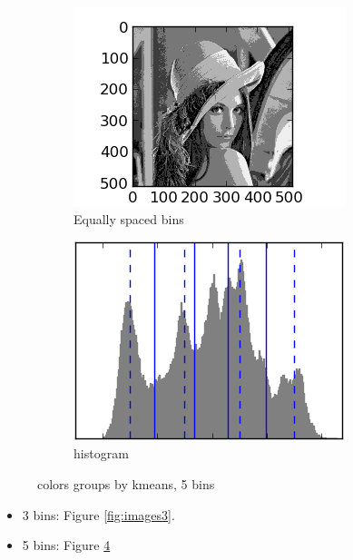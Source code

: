 \documentclass{article}
\begin{document}
\begin{figure}
\begin{subfigure}[b]{0.3\textwidth}
                    \label{fig:compressed5}
            \end{subfigure}
            ~ %
            \begin{subfigure}[b]{0.3\textwidth}
                    \centering
                    \includegraphics[width=\textwidth]{equal_bins_5.png}
                    \caption{Equally spaced bins}
                    \label{fig:equal_bins5}
            \end{subfigure}
            
            \begin{subfigure}[b]{0.3\textwidth}
                    \centering
                    \includegraphics[width=\textwidth]{histogram_5.png}
                    \caption{histogram}
                    \label{fig:histogram5}
            \end{subfigure}
            \caption{colors groups by kmeans, 5 bins}\label{fig:images5}
    \end{figure}
\begin{itemize}

    \item	3 bins: Figure \ref{fig:images3}.
    \item   5 bins: Figure \ref{fig:images5}
	
\end{itemize}
\end{document}
